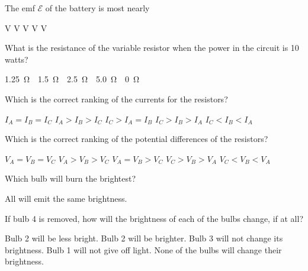 \documentclass{../../../oss-apphys-exam}
\begin{document}
\begin{questions}
  \question The emf $\mathcal E$ of the battery is most nearly
  \label{adjust1}
  \begin{choices}
     V
     V
     V
     V
     V
  \end{choices}
    
  \question What is the resistance of the variable resistor when the power
  in the circuit is 10 watts?
  \label{adjust2}
  \begin{choices}
    \choice\SI{1.25}\ohm
    \choice\SI{1.5}\ohm
    \choice\SI{2.5}\ohm
    \choice\SI{5.0}\ohm
    \choice\SI{0}\ohm
  \end{choices}    
    

  \question Which is the correct ranking of the currents for the resistors?
  \label{series1}
  \begin{choices}
    \choice$I_A=I_B=I_C$
    \choice$I_A>I_B>I_C$
    \choice$I_C>I_A=I_B$
    \choice$I_C>I_B>I_A$
    \choice$I_C<I_B<I_A$
  \end{choices}

  \question Which is the correct ranking of the potential differences of the
  resistors?
  \label{series2}
  \begin{choices}
    \choice $V_A=V_B=V_C$
    \choice $V_A>V_B>V_C$
    \choice $V_A=V_B>V_C$
    \choice $V_C>V_B>V_A$
    \choice $V_C<V_B<V_A$
  \end{choices}    
    
  \question Which bulb will burn the brightest?
  \label{bulb1}
  \begin{choices}
    \choice All will emit the same brightness.
  \end{choices}
    
  \question If bulb 4 is removed, how will the brightness of each of the bulbs
  change, if at all?
  \label{bulb2}
  \begin{choices}
    \choice Bulb 2 will be less bright.
    \choice Bulb 2 will be brighter.
    \choice Bulb 3 will not change its brightness.
    \choice Bulb 1 will not give off light.
    \choice None of the bulbs will change their brightness.
  \end{choices}


\end{questions}
\end{document}
